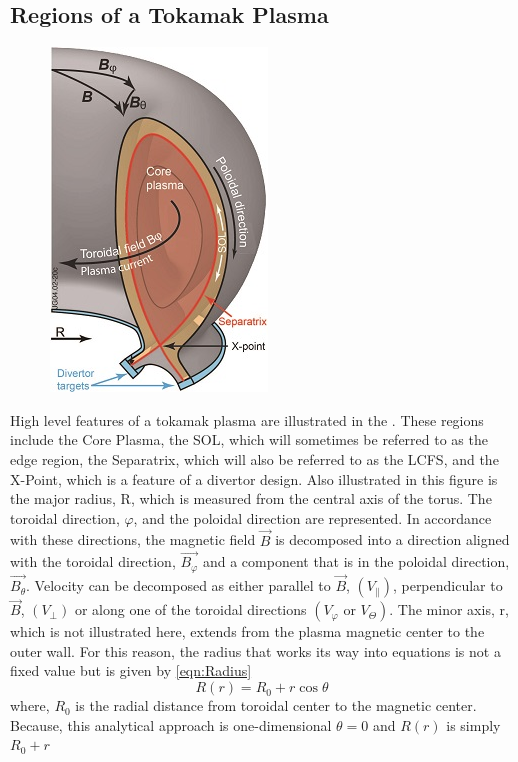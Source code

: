 \subsection{Regions of a Tokamak Plasma} \label{sub:RegionsOfPlasma}

\begin{figure}
	\centering
	\includegraphics[width=0.5\linewidth]{images/RegionsOfaTokamakPlasma}
	\caption[Features of a Tokamak Plasma\cite{LipschultzBandSharples}]{}
	\label{fig:featuressofatokamakplasma}
\end{figure}

High level features of a tokamak plasma are illustrated in the . These regions include the Core Plasma, the \acf{SOL}, which will sometimes be referred to as the edge region, the Separatrix, which will also be referred to as the \acf{LCFS}, and the X-Point, which is a feature of a divertor design. Also illustrated in this figure is the major radius, R, which is measured from the central axis of the torus. The toroidal direction, $\varphi$, and the poloidal direction are represented. In accordance with these directions, the magnetic field $\vec{B}$ is decomposed into a direction aligned with the toroidal direction, $\vec{B_\varphi}$ and a component that is in the poloidal direction, $\vec{B_\theta}$. Velocity can be decomposed as either parallel to $\vec{B}$, $\left(V_\parallel\right)$, perpendicular to $\vec{B}$, $\left(V_\perp\right)$ or along one of the toroidal directions $\left(V_\varphi \text{ or } V_\varTheta\right)$. The minor axis, r, which is not illustrated here, extends from the plasma magnetic center to the outer wall. For this reason, the radius that works its way into equations is not a fixed value but is given by \cref{eqn:Radius}
%
\begin{equation}
	R\left(r\right) = R_0 + r\cos \theta
	\label{eqn:Radius}
\end{equation}
%
where, $R_0$ is the radial distance from toroidal center to the magnetic center. Because, this analytical approach is one-dimensional $\theta = 0$ and $R\left(r\right)$ is simply $R_0 + r$
